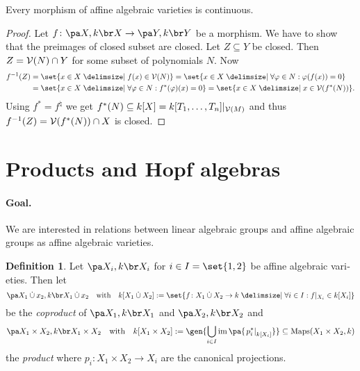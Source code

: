 \documentclass[12pt,a4paper]{scrartcl}
\theoremstyle{cplain}
\theoremstyle{cplain}
\theoremstyle{cplain}
\theoremstyle{definition}
\newtheorem*{deff}{Definition}
\begin{document}
\begin{otherlanguage}{english}
\begin{lem}
  Every morphism of affine algebraic varieties is continuous.
\end{lem}
\begin{proof}
  Let $f\colon \aav X \to \aav Y$ be a morphism. We have to show that the preimages of closed subset are closed. Let $Z\subseteq Y$ be closed. Then $Z = \mathcal{V}(N) \cap Y$ for some subset of polynomials $N$.  Now
  \begin{align*}
    f^{-1}(Z) &= \set{x\in X \given f(x) \in \Vs(N)} = \set{x\in X \given \forall\phi\in N:\phi(f(x)) = 0} \\&= \set{x\in X \given \forall \phi\in N:f^*(\phi)(x) = 0} = \set{x\in X \given x \in \Vs(f^*(N)) }.
  \end{align*}
  Using $f^* = f^\natural$ we get $f^*(N) \subseteq k[X] = k[T_1,\ldots,T_n]|_{\mathcal{V}(M)}$ and thus $f^{-1}(Z) = \mathcal{V}(f^*(N)) \cap X$ is closed.
\end{proof}

\section{Products and Hopf algebras}
\paragraph{Goal.}
We are interested in relations between linear algebraic groups and affine algebraic groups as affine algebraic varieties. %

\begin{deff}
  Let $\aav{X_i}$ for $i\in I=\set{1,2}$ be affine algebraic varieties. Then let \[ \aav{X_1\dotcup x_2} \quad\text{with}\quad k[X_1\dotcup X_2] := \set{f\colon X_1 \dotcup X_2 \to k \given \forall i \in I : f|_{X_i} \in k[X_i]} \] be the \emph{coproduct} of $\aav{X_1}$ and $\aav{X_2}$ and \[ \aav{X_1\times X_2} \quad\text{with}\quad k[X_1\times X_2] := \gen{\bigcup_{i\in I}\im \pa{\left.p_i^*\right|_{k[X_i]}}} \subseteq \Maps(X_1\times X_2, k)  \] the \emph{product} where $p_i\colon X_1\times X_2 \to X_i$ are the canonical projections.
\end{deff}


\end{otherlanguage}
\end{document}
